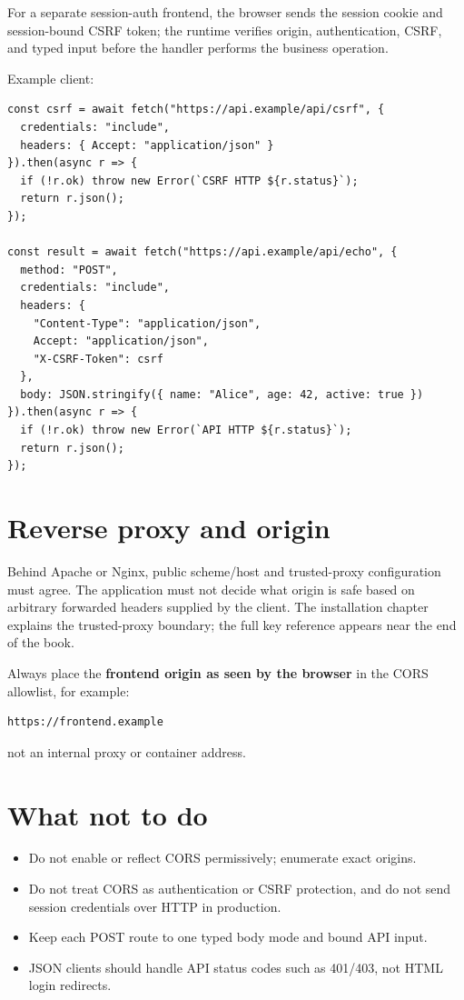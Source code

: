For a separate session-auth frontend, the browser sends the session cookie and session-bound CSRF token; the runtime verifies origin, authentication, CSRF, and typed input before the handler performs the business operation.

Example client:

\begin{lstlisting}
const csrf = await fetch("https://api.example/api/csrf", {
  credentials: "include",
  headers: { Accept: "application/json" }
}).then(async r => {
  if (!r.ok) throw new Error(`CSRF HTTP ${r.status}`);
  return r.json();
});

const result = await fetch("https://api.example/api/echo", {
  method: "POST",
  credentials: "include",
  headers: {
    "Content-Type": "application/json",
    Accept: "application/json",
    "X-CSRF-Token": csrf
  },
  body: JSON.stringify({ name: "Alice", age: 42, active: true })
}).then(async r => {
  if (!r.ok) throw new Error(`API HTTP ${r.status}`);
  return r.json();
});
\end{lstlisting}

\section{Reverse proxy and origin}

Behind Apache or Nginx, public scheme/host and trusted-proxy configuration must agree. The application must not decide what origin is safe based on arbitrary forwarded headers supplied by the client. The installation chapter explains the trusted-proxy boundary; the full  key reference appears near the end of the book.

Always place the \textbf{frontend origin as seen by the browser} in the CORS allowlist, for example:

\begin{lstlisting}
https://frontend.example
\end{lstlisting}

not an internal proxy or container address.

\section{What not to do}

\begin{itemize}
  \item Do not enable or reflect CORS permissively; enumerate exact origins.
  \item Do not treat CORS as authentication or CSRF protection, and do not send session credentials over HTTP in production.
  \item Keep each POST route to one typed body mode and bound API input.
  \item JSON clients should handle API status codes such as 401/403, not HTML login redirects.
\end{itemize}

